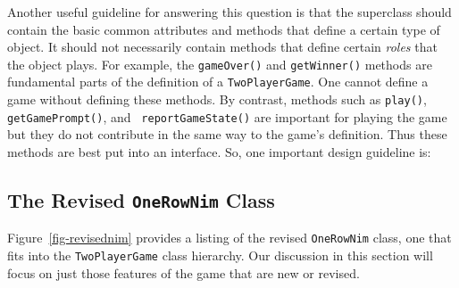 Another useful guideline for answering this question is that the
superclass should contain the basic common attributes and methods that
define a certain type of object.  It should not necessarily contain
methods that define certain {\em roles} that the object plays.  For
example, the {\tt gameOver()} and {\tt getWinner()} methods are
fundamental parts of the definition of a {\tt TwoPlayerGame}.  One
cannot define a game without defining these methods.  By contrast,
methods such as {\tt play()}, {\tt getGamePrompt()}, and {\tt
reportGameState()} are important for playing the game but they do not
contribute in the same way to the game's definition. Thus these
methods are best put into an interface. So, one important design
guideline is:


\subsection{The Revised {\tt OneRowNim} Class}

Figure~\ref{fig-revisednim} provides a listing of the revised 
{\tt OneRowNim} class, one that fits into the {\tt TwoPlayerGame}
class hierarchy. Our discussion in this section will focus on just
those features of the game that are new or revised.

